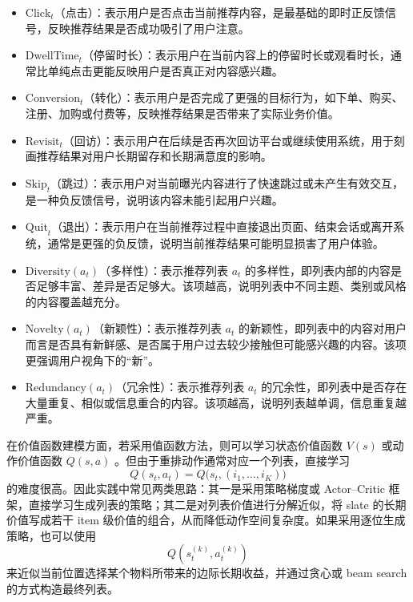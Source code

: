 \documentclass[UTF8]{ctexart}
\begin{document}
\begin{itemize}
\item \(\mathrm{Click}_t\)（点击）：表示用户是否点击当前推荐内容，是最基础的即时正反馈信号，反映推荐结果是否成功吸引了用户注意。

\item \(\mathrm{DwellTime}_t\)（停留时长）：表示用户在当前内容上的停留时长或观看时长，通常比单纯点击更能反映用户是否真正对内容感兴趣。

\item \(\mathrm{Conversion}_t\)（转化）：表示用户是否完成了更强的目标行为，如下单、购买、注册、加购或付费等，反映推荐结果是否带来了实际业务价值。

\item \(\mathrm{Revisit}_t\)（回访）：表示用户在后续是否再次回访平台或继续使用系统，用于刻画推荐结果对用户长期留存和长期满意度的影响。

\item \(\mathrm{Skip}_t\)（跳过）：表示用户对当前曝光内容进行了快速跳过或未产生有效交互，是一种负反馈信号，说明该内容未能引起用户兴趣。

\item \(\mathrm{Quit}_t\)（退出）：表示用户在当前推荐过程中直接退出页面、结束会话或离开系统，通常是更强的负反馈，说明当前推荐结果可能明显损害了用户体验。

\item \(\mathrm{Diversity}(a_t)\)（多样性）：表示推荐列表 \(a_t\) 的多样性，即列表内部的内容是否足够丰富、差异是否足够大。该项越高，说明列表中不同主题、类别或风格的内容覆盖越充分。

\item \(\mathrm{Novelty}(a_t)\)（新颖性）：表示推荐列表 \(a_t\) 的新颖性，即列表中的内容对用户而言是否具有新鲜感、是否属于用户过去较少接触但可能感兴趣的内容。该项更强调用户视角下的``新''。

\item \(\mathrm{Redundancy}(a_t)\)（冗余性）：表示推荐列表 \(a_t\) 的冗余性，即列表中是否存在大量重复、相似或信息重合的内容。该项越高，说明列表越单调，信息重复越严重。
\end{itemize}

在价值函数建模方面，若采用值函数方法，则可以学习状态价值函数 \(V(s)\) 或动作价值函数 \(Q(s,a)\) 。但由于重排动作通常对应一个列表，直接学习
\[ Q(s_t,a_t)=Q\!\bigl(s_t,(i_1,\dots,i_K)\bigr) \]
的难度很高。因此实践中常见两类思路：其一是采用策略梯度或 Actor--Critic 框架，直接学习生成列表的策略；其二是对列表价值进行分解近似，将 slate 的长期价值写成若干 item 级价值的组合，从而降低动作空间复杂度。如果采用逐位生成策略，也可以使用
\[ Q\!\left(s_t^{(k)},a_t^{(k)}\right) \]
来近似当前位置选择某个物料所带来的边际长期收益，并通过贪心或 beam search 的方式构造最终列表。
\end{document}
